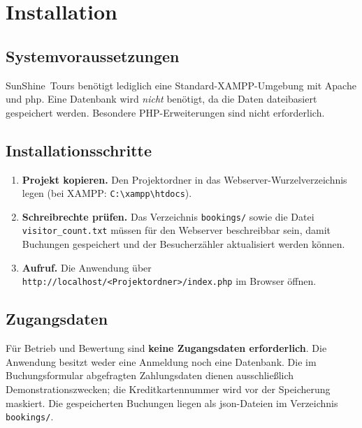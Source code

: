 \chapter{Installation}
\label{ch:b-installation}

\section{Systemvoraussetzungen}
SunShine~Tours ben\"otigt lediglich eine Standard-XAMPP-Umgebung mit Apache und \ac{php}. Eine
Datenbank wird \emph{nicht} ben\"otigt, da die Daten dateibasiert gespeichert werden. Besondere
PHP-Erweiterungen sind nicht erforderlich.

\section{Installationsschritte}
\begin{enumerate}
  \item \textbf{Projekt kopieren.} Den Projektordner in das Webserver-Wurzelverzeichnis legen
        (bei XAMPP: \texttt{C:\textbackslash\allowbreak xampp\textbackslash\allowbreak htdocs}).
  \item \textbf{Schreibrechte pr\"ufen.} Das Verzeichnis \texttt{bookings/} sowie die Datei
        \texttt{visitor\_\allowbreak count.txt} m\"ussen f\"ur den Webserver beschreibbar sein, damit Buchungen
        gespeichert und der Besucherz\"ahler aktualisiert werden k\"onnen.
  \item \textbf{Aufruf.} Die Anwendung \"uber
        \texttt{http://localhost/\allowbreak<Projektordner>/\allowbreak index.php} im Browser \"offnen.
\end{enumerate}

\section{Zugangsdaten}
F\"ur Betrieb und Bewertung sind \textbf{keine Zugangsdaten erforderlich}. Die Anwendung besitzt
weder eine Anmeldung noch eine Datenbank. Die im Buchungsformular abgefragten Zahlungsdaten
dienen ausschlie\ss{}lich Demonstrationszwecken; die Kreditkartennummer wird vor der Speicherung
maskiert. Die gespeicherten Buchungen liegen als \ac{json}-Dateien im Verzeichnis
\texttt{bookings/}.
